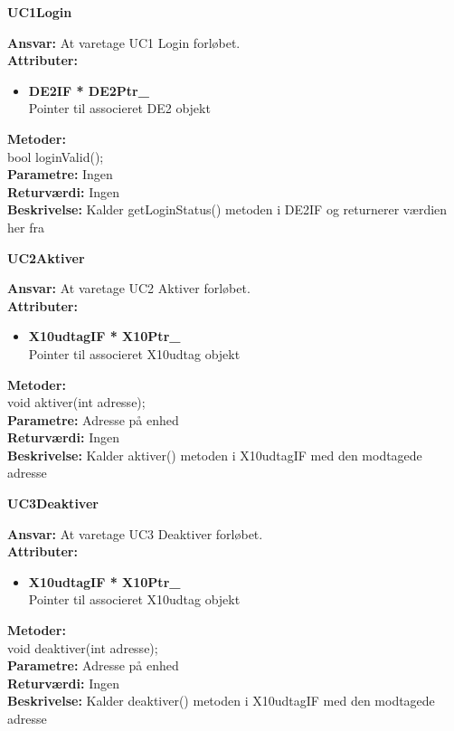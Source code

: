%
%
{\centering
\textbf{UC1Login}\par
}
\textbf{Ansvar:} At varetage UC1 Login forløbet. \\
\textbf{Attributer:}
\begin{itemize}
	\item \textbf{DE2IF * DE2Ptr\_} \\
	Pointer til associeret DE2 objekt
\end{itemize}
\textbf{Metoder:} \\
bool loginValid(); \\
\textbf{Parametre:} Ingen \\
\textbf{Returværdi:} Ingen \\
\textbf{Beskrivelse:} Kalder getLoginStatus() metoden i DE2IF og returnerer værdien her fra \\

%
%
{\centering
\textbf{UC2Aktiver}\par
}
\textbf{Ansvar:} At varetage UC2 Aktiver forløbet. \\
\textbf{Attributer:}
\begin{itemize}
	\item \textbf{X10udtagIF * X10Ptr\_} \\
	Pointer til associeret X10udtag objekt
\end{itemize}
\textbf{Metoder:} \\
void aktiver(int adresse); \\
\textbf{Parametre:} Adresse på enhed \\
\textbf{Returværdi:} Ingen \\
\textbf{Beskrivelse:} Kalder aktiver() metoden i X10udtagIF med den modtagede adresse \\

%
%
{\centering
\textbf{UC3Deaktiver}\par
}
\textbf{Ansvar:} At varetage UC3 Deaktiver forløbet. \\
\textbf{Attributer:}
\begin{itemize}
	\item \textbf{X10udtagIF * X10Ptr\_} \\
	Pointer til associeret X10udtag objekt
\end{itemize}
\textbf{Metoder:} \\
void deaktiver(int adresse); \\
\textbf{Parametre:} Adresse på enhed \\
\textbf{Returværdi:} Ingen \\
\textbf{Beskrivelse:} Kalder deaktiver() metoden i X10udtagIF med den modtagede adresse \\

